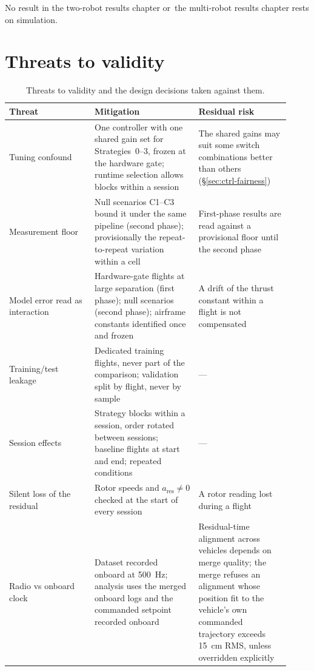 No result in the two-robot results chapter or~the multi-robot results chapter rests on simulation.

\section{Threats to validity}
\label{sec:setup-validity}

\begin{table}[t]
  \centering
  \caption{Threats to validity and the design decisions taken against them.}
  \label{tab:setup-threats}
  \small
  \begin{tabular}{@{}p{0.28\linewidth}p{0.34\linewidth}p{0.30\linewidth}@{}}
    \toprule
    Threat & Mitigation & Residual risk \\
    \midrule
    Tuning confound & One controller with one shared gain set for Strategies~0--3, frozen at the hardware gate; runtime selection allows blocks within a session & The shared gains may suit some switch combinations better than others (§\ref{sec:ctrl-fairness}) \\
    Measurement floor & Null scenarios C1--C3 bound it under the same pipeline (second phase); provisionally the repeat-to-repeat variation within a cell & First-phase results are read against a provisional floor until the second phase \\
    Model error read as interaction & Hardware-gate flights at large separation (first phase); null scenarios (second phase); airframe constants identified once and frozen & A drift of the thrust constant within a flight is not compensated \\
    Training/test leakage & Dedicated training flights, never part of the comparison; validation split by flight, never by sample & --- \\
    Session effects & Strategy blocks within a session, order rotated between sessions; baseline flights at start and end; repeated conditions & --- \\
    Silent loss of the residual & Rotor speeds and $a_{\mathrm{res}} \neq 0$ checked at the start of every session & A rotor reading lost during a flight \\
    Radio vs onboard clock & Dataset recorded onboard at \SI{500}{\hertz}; analysis uses the merged onboard logs and the commanded setpoint recorded onboard & Residual-time alignment across vehicles depends on merge quality; the merge refuses an alignment whose position fit to the vehicle's own commanded trajectory exceeds \SI{15}{\centi\metre} RMS, unless overridden explicitly \\

\end{tabular}
\end{table}

